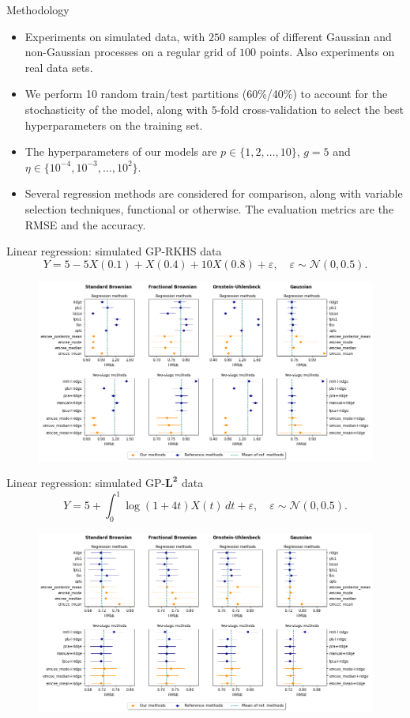 \documentclass[9pt, english, professionalfonts]{beamer}
\renewcommand{\epsilon}{\varepsilon}
\begin{document}
\begin{frame}{Methodology}
  \begin{itemize}
    \item Experiments on simulated data, with \(250\) samples of different Gaussian and non-Gaussian processes on a regular grid of \(100\) points. Also experiments on real data sets.
    \item We perform 10 random train/test partitions (60\%/40\%) to account for the stochasticity of the model, along with \(5\)-fold cross-validation to select the best hyperparameters on the training set.
    \item The hyperparameters of our models are \(p\in\{1,2,\dots,10\}\), \(g=5\) and \(\eta \in \{10^{-4}, 10^{-3}, \dots, 10^2\}\).
    \item Several regression methods are considered for comparison, along with variable selection techniques, functional or otherwise. The evaluation metrics are the RMSE and the accuracy.
  \end{itemize}
\end{frame}

\begin{frame}{Linear regression: simulated GP-RKHS data}
  \[
  Y=5 -5X(0.1) + X(0.4) + 10X(0.8) + \epsilon, \quad \epsilon \sim \mathcal N(0, 0.5).
  \]
  \begin{figure}
    \includegraphics[width=.95\textwidth]{reg_emcee_rkhs}
  \end{figure}
\end{frame}

\begin{frame}{Linear regression: simulated GP-\(\bm{L^2}\) data}
  \[
  Y = 5 + \int_0^1 \log(1+4t)X(t)\, dt + \epsilon, \quad \epsilon \sim \mathcal N(0, 0.5).
  \]
  \begin{figure}
    \includegraphics[width=.95\textwidth]{reg_emcee_l2}
  \end{figure}
\end{frame}
\end{document}
